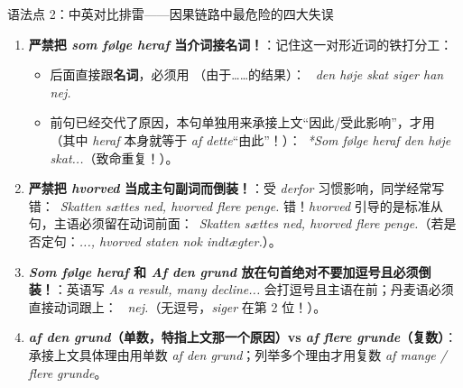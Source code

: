 \begin{grammatikbox}{语法点 2：中英对比排雷——因果链路中最危险的四大失误}
\begin{enumerate}
  \item \textbf{严禁把 \textit{som følge heraf} 当介词接名词！}：记住这一对形近词的铁打分工：
    \begin{itemize}
      \item 后面直接跟\textbf{名词}，必须用 （由于……的结果）：\ \textit{ den høje skat siger han nej.}
      \item 前句已经交代了原因，本句单独用来承接上文“因此/受此影响”，才用 （其中 \textit{heraf} 本身就等于 \textit{af dette}“由此”！）：\ \textit{*Som følge heraf den høje skat...}（致命重复！）。
    \end{itemize}
  \item \textbf{严禁把 \textit{hvorved} 当成主句副词而倒装！}：受 \textit{derfor} 习惯影响，同学经常写错：\ \textit{Skatten sættes ned, hvorved  flere penge.} 错！\textit{hvorved} 引导的是标准从句，主语必须留在动词前面：\ \textit{Skatten sættes ned, hvorved  flere penge.}（若是否定句：\textit{..., hvorved staten  nok indtægter.}）。
  \item \textbf{\textit{Som følge heraf} 和 \textit{Af den grund} 放在句首绝对不要加逗号且必须倒装！}：英语写 \textit{As a result, many decline...} 会打逗号且主语在前；丹麦语必须直接动词跟上：\ \textit{  nej.}（无逗号，\textit{siger} 在第 2 位！）。
  \item \textbf{\textit{af den grund}（单数，特指上文那一个原因）vs \textit{af flere grunde}（复数）}：承接上文具体理由用单数 \textit{af den grund}；列举多个理由才用复数 \textit{af mange / flere grunde}。
\end{enumerate}
\end{grammatikbox}


